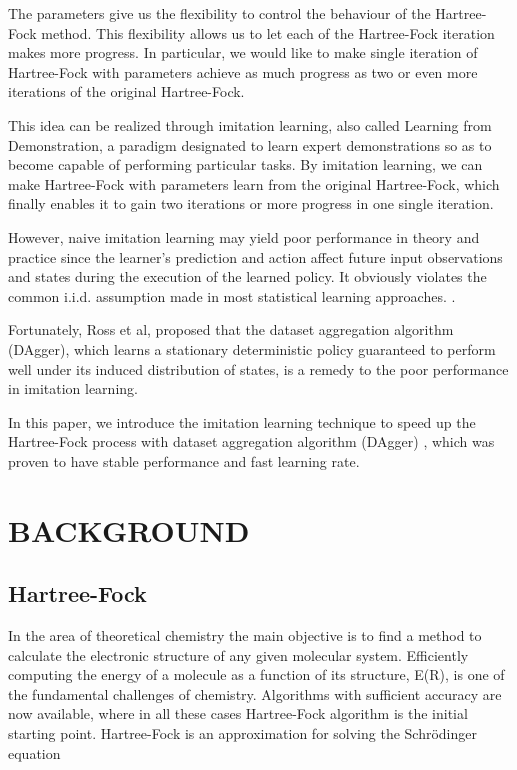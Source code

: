 \documentclass[twoside]{article}
\begin{document}
The parameters give us the flexibility to control the behaviour of the Hartree-Fock method. This flexibility allows us to let each of the Hartree-Fock iteration makes more progress. In particular, we would like to make single iteration of Hartree-Fock with parameters achieve as much progress as two or even more iterations of the original Hartree-Fock.


This idea can be realized through imitation learning, also called Learning from Demonstration, a paradigm designated to learn expert demonstrations so as to become capable of performing particular tasks. By imitation learning, we can make Hartree-Fock with parameters learn from the original Hartree-Fock, which finally enables it to gain two iterations or more progress in one single iteration.


However, naive imitation learning may yield poor performance in theory and practice since the learner's prediction and action affect future input observations and states during the execution of the learned policy. It obviously violates the common i.i.d. assumption made in most statistical learning approaches. \cite{Ross}.


Fortunately, Ross et al,\cite{DAgger} proposed that the dataset aggregation algorithm (DAgger), which learns a stationary deterministic policy guaranteed to perform well under its induced distribution of states, is a remedy to the poor performance in imitation learning.


In this paper,  we introduce the imitation learning technique to speed up the Hartree-Fock process with dataset aggregation algorithm (DAgger) \cite{DAgger}, which was proven to have stable performance and fast learning rate. \cite{DAggerCompare}


\section{BACKGROUND}

\subsection{Hartree-Fock}

In the area of theoretical chemistry the main objective is to find a method to calculate the electronic structure of any given molecular system. Efficiently computing the energy of a molecule as a function of its structure, E(R), is one of the fundamental challenges of chemistry. Algorithms with sufficient accuracy are now available, where in all these cases Hartree-Fock algorithm is the initial starting point. Hartree-Fock is an approximation for solving the Schrödinger equation 
\end{document}
